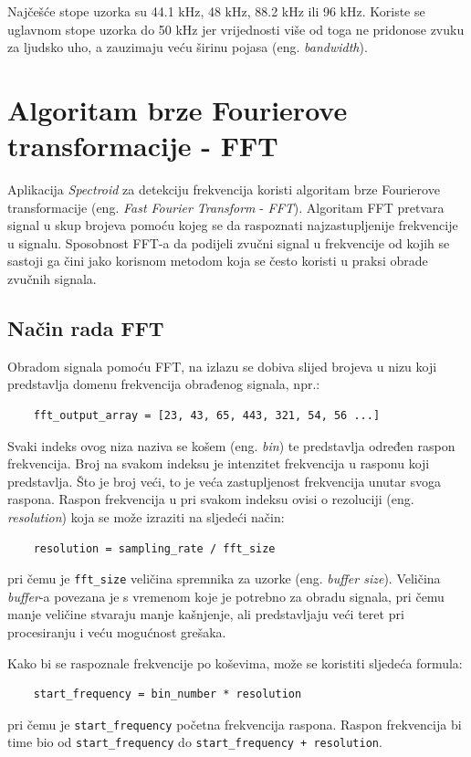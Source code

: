 \documentclass[times, utf8, zavrsni, numeric]{fer}
\begin{document}
Najčešće stope uzorka su 44.1 kHz, 48 kHz, 88.2 kHz ili 96 kHz.\cite{self2012audio} Koriste se uglavnom stope uzorka do 50 kHz jer vrijednosti više od toga ne pridonose zvuku za ljudsko uho, a zauzimaju veću širinu pojasa (eng. \textit{bandwidth}).

\chapter{Algoritam brze Fourierove transformacije - FFT}
Aplikacija \textit{Spectroid} za detekciju frekvencija koristi algoritam brze Fourierove transformacije (eng. \textit{Fast Fourier Transform} - \textit{FFT}). Algoritam FFT pretvara signal u skup brojeva pomoću kojeg se da raspoznati najzastupljenije frekvencije u signalu. Sposobnost FFT-a da podijeli zvučni signal u frekvencije od kojih se sastoji ga čini jako korisnom metodom koja se često koristi u praksi obrade zvučnih signala.\cite{gustine_2021}

\section{Način rada FFT}
Obradom signala pomoću FFT, na izlazu se dobiva slijed brojeva u nizu koji predstavlja domenu frekvencija obrađenog signala, npr.:
\begin{verbatim}
	fft_output_array = [23, 43, 65, 443, 321, 54, 56 ...]
\end{verbatim}
Svaki indeks ovog niza naziva se košem (eng. \textit{bin}) te predstavlja određen raspon frekvencija. Broj na svakom indeksu je intenzitet frekvencija u rasponu koji predstavlja. Što je broj veći, to je veća zastupljenost frekvencija unutar svoga raspona. Raspon frekvencija u pri svakom indeksu ovisi o rezoluciji (eng. \textit{resolution}) koja se može izraziti na sljedeći način:
\begin{verbatim}
	resolution = sampling_rate / fft_size
\end{verbatim}
pri čemu je \verb|fft_size| veličina spremnika za uzorke (eng. \textit{buffer size}).\cite{lourde2009digital} Veličina \textit{buffer}-a povezana je s vremenom koje je potrebno za obradu signala, pri čemu manje veličine stvaraju manje kašnjenje, ali predstavljaju veći teret pri procesiranju i veću mogućnost grešaka.\cite{focusrite_2022}

Kako bi se raspoznale frekvencije po koševima, može se koristiti sljedeća formula:
\begin{verbatim}
	start_frequency = bin_number * resolution
\end{verbatim}
pri čemu je \verb|start_frequency| početna frekvencija raspona.\cite{gustine_2021} Raspon frekvencija bi time bio od \verb|start_frequency| do \verb|start_frequency + resolution|.
\end{document}
